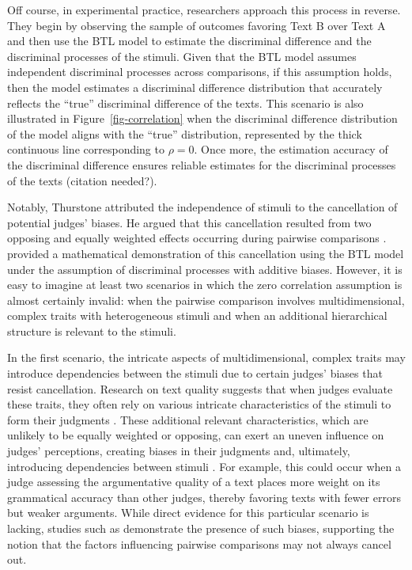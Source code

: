 \documentclass[
  authoryear,
  review,
  1p]{elsarticle}
\begin{document}
Off course, in experimental practice, researchers approach this process
in reverse. They begin by observing the sample of outcomes favoring Text
B over Text A and then use the BTL model to estimate the discriminal
difference and the discriminal processes of the stimuli. Given that the
BTL model assumes independent discriminal processes across comparisons,
if this assumption holds, then the model estimates a discriminal
difference distribution that accurately reflects the ``true''
discriminal difference of the texts. This scenario is also illustrated
in Figure~\ref{fig-correlation} when the discriminal difference
distribution of the model aligns with the ``true'' distribution,
represented by the thick continuous line corresponding to \(\rho=0\).
Once more, the estimation accuracy of the discriminal difference ensures
reliable estimates for the discriminal processes of the texts {(citation
needed?)}.

Notably, Thurstone attributed the independence of stimuli to the
cancellation of potential judges' biases. He argued that this
cancellation resulted from two opposing and equally weighted effects
occurring during pairwise comparisons \citep[pp.~268]{Thurstone_1927b}.
\citet{Andrich_1978} provided a mathematical demonstration of this
cancellation using the BTL model under the assumption of discriminal
processes with additive biases. However, it is easy to imagine at least
two scenarios in which the zero correlation assumption is almost
certainly invalid: when the pairwise comparison involves
multidimensional, complex traits with heterogeneous stimuli and when an
additional hierarchical structure is relevant to the stimuli.

In the first scenario, the intricate aspects of multidimensional,
complex traits may introduce dependencies between the stimuli due to
certain judges' biases that resist cancellation. Research on text
quality suggests that when judges evaluate these traits, they often rely
on various intricate characteristics of the stimuli to form their
judgments
\citep{vanDaal_et_al_2016, Lesterhuis_2018, Chambers_et_al_2022}. These
additional relevant characteristics, which are unlikely to be equally
weighted or opposing, can exert an uneven influence on judges'
perceptions, creating biases in their judgments and, ultimately,
introducing dependencies between stimuli
\citep[pp.~346]{vanderLinden_et_al_2017_II}. For example, this could
occur when a judge assessing the argumentative quality of a text places
more weight on its grammatical accuracy than other judges, thereby
favoring texts with fewer errors but weaker arguments. While direct
evidence for this particular scenario is lacking, studies such as
\citet{Pollitt_et_al_2003} demonstrate the presence of such biases,
supporting the notion that the factors influencing pairwise comparisons
may not always cancel out.
\end{document}
